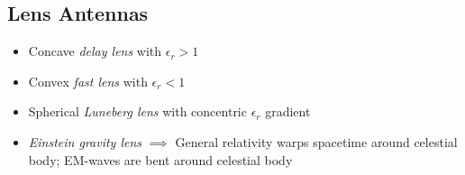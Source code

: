 \subsection{Lens Antennas}
\begin{itemize}
    \item Concave \textit{delay lens} with $\epsilon_r > 1$
    \item Convex \textit{fast lens} with $\epsilon_r < 1$
    \item Spherical \textit{Luneberg lens} with concentric $\epsilon_r$ gradient
    \item \textit{Einstein gravity lens}  $\implies$ General relativity warps spacetime around celestial body; EM-waves are bent around celestial body
\end{itemize}
